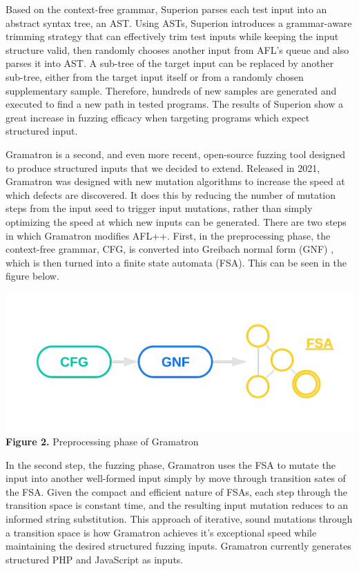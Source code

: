 \documentclass[12pt]{diazessay}
\begin{document}
Based on the context-free grammar, Superion parses each test input into an abstract syntax tree, an AST. Using ASTs, Superion introduces a grammar-aware trimming strategy that can effectively trim test inputs while keeping the input structure valid, then randomly chooses another input from AFL’s queue and also parses it into AST. A sub-tree of the target input can be replaced by another sub-tree, either from the target input itself or from a randomly chosen supplementary sample. Therefore, hundreds of new samples are generated and executed to find a new path in tested programs. The results of Superion show a great increase in fuzzing efficacy when targeting programs which expect structured input.


\clearpage

Gramatron\cite{srivastava2021gramatron} is a second, and even more recent, open-source fuzzing tool designed to produce structured inputs that we decided to extend.
Released in 2021, Gramatron was designed with new mutation algorithms to increase the speed at which defects are discovered.
It does this by reducing the number of mutation steps from the input seed to trigger input mutations, rather than simply optimizing the speed at which new inputs can be generated. There are two steps in which Gramatron modifies AFL++. First, in the preprocessing phase, the context-free grammar, CFG, is converted into Greibach normal form (GNF) \cite{greibach1965new}, which is then turned into a finite state automata (FSA). This can be seen in the figure below.

\vspace{-1cm}
\begin{center}
	\includegraphics[scale=0.4, trim={0 3cm 0 0}, clip]{gramatronfig.png}\\
	\textbf{Figure 2.} Preprocessing phase of Gramatron
\end{center}
\vspace{6mm}

In the second step, the fuzzing phase, Gramatron uses the FSA to mutate the input into another well-formed input simply by move through transition sates of the FSA.
Given the compact and efficient nature of FSAs, each step through the transition space is constant time, and the resulting input mutation reduces to an informed string substitution.
This approach of iterative, sound mutations through a transition space is how Gramatron achieves it's exceptional speed while maintaining the desired structured fuzzing inputs.
Gramatron currently generates structured PHP and JavaScript as inputs.
\end{document}
